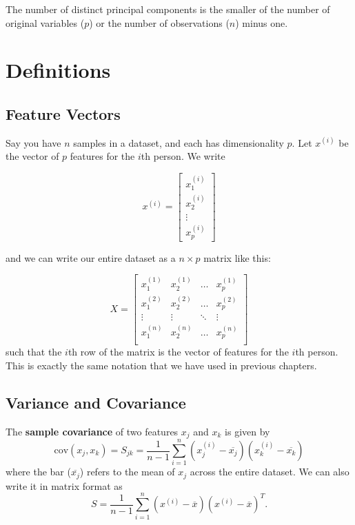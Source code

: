 The number of distinct principal components is the smaller of the number of original variables ($p$) or the number of observations ($n$) minus one.


\section{Definitions}

\subsection{Feature Vectors}

Say you have $n$ samples in a dataset, and each has dimensionality $p$. Let $x^{(i)}$ be the vector of $p$ features for the $i$th person. We write

$$ x^{(i)} = \begin{bmatrix}
           x_{1}^{(i)} \\
           x_{2}^{(i)} \\
           \vdots \\
           x_{p}^{(i)}
         \end{bmatrix} $$
        
\noindent and we can write our entire dataset as a $n \times p$ matrix like this:

$$ X = \begin{bmatrix}
x_1^{(1)} & x_2^{(1)} & \dots & x_p^{(1)} \\
x_1^{(2)} & x_2^{(2)} & \dots & x_p^{(2)} \\
\vdots & \vdots & \ddots & \vdots \\
x_1^{(n)} & x_2^{(n)} & \dots & x_p^{(n)} \\
\end{bmatrix} $$ 
such that the $i$th row of the matrix is the vector of features for the $i$th person. This is exactly the same notation that we have used in previous chapters.  

\subsection{Variance and Covariance \label{ssect:varcovar}}

The \textbf{sample covariance} of two features $x_j$ and $x_k$ is given by
$$ \text{cov}(x_j, x_k) = S_{jk} = \frac{1}{n-1} \sum_{i=1}^{n}\left(x_j^{(i)}-\overline{x_j}\right) \left(x_k^{(i)}-\overline{x_k}\right) $$
where the bar ($\overline{x_j}$) refers to the mean of $x_j$ across the entire dataset. We can also write it in matrix format as
$$ S = \frac{1}{n-1} \sum_{i=1}^n (x^{(i)} - \overline{x})(x^{(i)} - \overline{x})^T. $$

